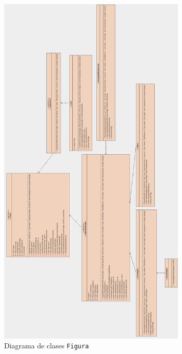 \begin{figure}
 \centering
  \includegraphics[width=0.8\textwidth]{diagramas/figura.png}
 \caption{Diagrama de clases \texttt{Figura}}
 \label{diseño}
 \end{figure}

